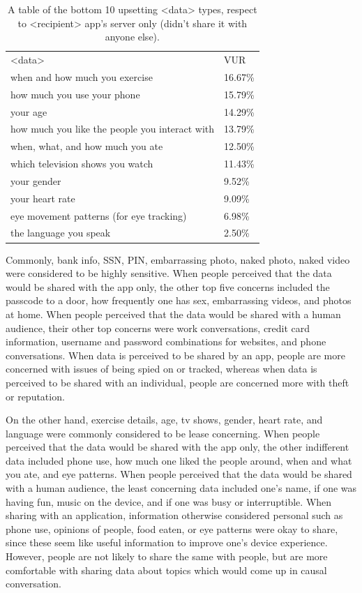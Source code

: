 \documentclass{acm_proc_article-sp}
\begin{document}
\begin{table}%
\begin{center}
\begin{tabular}{ll}
<data> &  VUR  \\
when and how much you exercise & 16.67\% \\
how much you use your phone & 15.79\% \\
your age & 14.29\% \\
how much you like the people you interact with & 13.79\% \\
when, what, and how much you ate & 12.50\% \\
which television shows you watch & 11.43\% \\
your gender & 9.52\% \\
your heart rate & 9.09\% \\
eye movement patterns (for eye tracking) & 6.98\% \\
the language you speak & 2.50\% \\
\end{tabular}
\caption{A table of the bottom 10 upsetting <data> types, respect to <recipient> app's server only (didn't share it with anyone else).}
\label{notsharedbottom10}
\end{center}
\end{table}


Commonly, bank info, SSN, PIN, embarrassing photo, naked photo, naked video were considered to be highly sensitive. When people perceived that the data would be shared with the app only, the other top five concerns included the passcode to a door, how frequently one has sex, embarrassing videos, and photos at home. When people perceived that the data would be shared with a human audience, their other top concerns were work conversations, credit card information, username and password combinations for websites, and phone conversations. When data is perceived to be shared by an app, people are more concerned with issues of being spied on or tracked, whereas when data is perceived to be shared with an individual, people are concerned more with theft or reputation. 

On the other hand, exercise details, age, tv shows, gender, heart rate, and language were commonly considered to be lease concerning. When people perceived that the data would be shared with the app only, the other indifferent data included phone use, how much one liked the people around, when and what you ate, and eye patterns. When people perceived that the data would be shared with a human audience, the least concerning data included one's name, if one was having fun, music on the device, and if one was busy or interruptible. When sharing with an application, information otherwise considered personal such as phone use, opinions of people, food eaten, or eye patterns were okay to share, since these seem like useful information to improve one's device experience. However, people are not likely to share the same with people, but are more comfortable with sharing data about topics which would come up in causal conversation.
\end{document}
